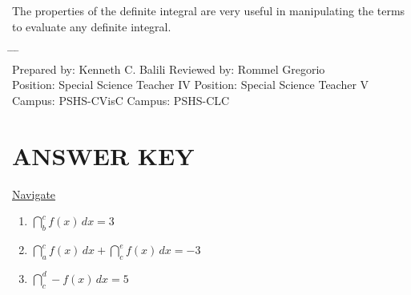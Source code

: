 \documentclass[11pt, a4paper]{article}
\begin{document}
The properties of the definite integral are very useful in manipulating the terms to evaluate any definite integral.

\nocite{herman}
\nocite{leithold}
\nocite{stewart}





\begin{tabbing}
\hspace{1in}	\= \hspace{2in} \= \hspace{1in} \= \hspace{2in} 	\kill\\
Prepared by:	\> Kenneth C. Balili	\> Reviewed by:	\> Rommel Gregorio\\
Position: 	\> Special Science Teacher IV 	\> Position: \> Special Science Teacher V\\
Campus:	\> PSHS-CVisC	\> Campus: 	\> PSHS-CLC
\end{tabbing}
\label{EndofModule}

\renewcommand*\footnoterule{}
\let\thefootnote\relax{}

\newpage
\pagestyle{empty}

\section*{ANSWER KEY}

\noindent\underline{Navigate}

\begin{enumerate}
\item $\dint_b^c f(x)\, dx = 3$
\item $\dint_a^c f(x)\, dx+\dint_c^e f(x)\, dx=-3$
\item $\dint_c^d -f(x)\, dx = 5$
\end{enumerate}
\end{document}
